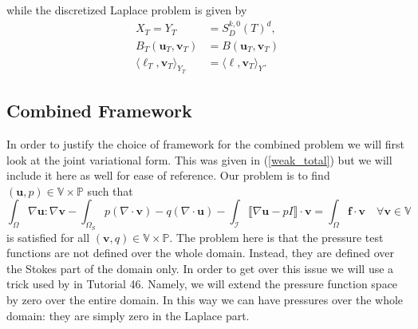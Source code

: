 \documentclass[12pt,a4paper]{article}
\theoremstyle{definition}
\begin{document}
while the discretized Laplace problem is given by 
\begin{equation}\label{frame_laplace_disc}
\begin{aligned}
X_T=Y_T&=S^{k,0}_D\left(T\right)^d,\\
B_T\left(\textbf{u}_T,\textbf{v}_T\right)&=B\left(\textbf{u}_T,\textbf{v}_T\right)\\
\langle \ell_T,\textbf{v}_T \rangle_{Y_T} &=\langle \ell,\textbf{v}_T \rangle_{Y}.
\end{aligned}
\end{equation}
\subsection{Combined Framework}
In order to justify the choice of framework for the combined problem we will first look at the joint variational form.  This was given in (\ref{weak_total}) but we will include it here as well for ease of reference.  Our problem is to find $\left(\textbf{u},p\right)\in \mathbb{V}\times\mathbb{P}$ such that
\begin{equation}
\int_{\Omega}\nabla \textbf{u} : \nabla \textbf{v}-\int_{\Omega_S}p\left(\nabla \cdot \textbf{v}\right)-q\left(\nabla \cdot \textbf{u}\right)  - \int_{\mathcal{I}} \llbracket\nabla\textbf{u}-pI\rrbracket\cdot\textbf{v} =\int_{\Omega}\textbf{f}\cdot \textbf{v} \quad \forall  \textbf{v}\in \mathbb{V}
\end{equation}
is satisfied for all $\left(\textbf{v},q\right)\in \mathbb{V}\times\mathbb{P}$.  The problem here is that the pressure test functions are not defined over the whole domain.  Instead, they are defined over the Stokes part of the domain only.  In order to get over this issue we will use a trick used by \cite{BangerthHartmannKanschat2007} in Tutorial 46.  Namely, we will extend the pressure function space by zero over the entire domain.  In this way we can have pressures over the whole  domain: they are simply zero in the Laplace part.
\end{document}
